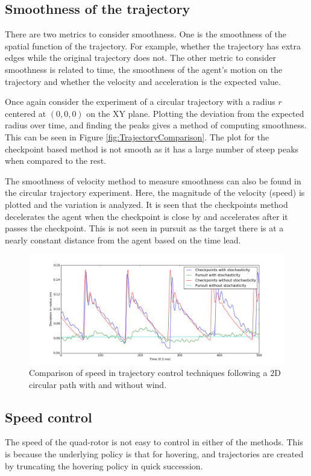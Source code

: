 \documentclass[hidelinks,BTech]{iitmdiss}
\begin{document}
\subsection{Smoothness of the trajectory}
There are two metrics to consider smoothness. One is the smoothness of the spatial function of the trajectory. For example, whether the trajectory has extra edges while the original trajectory does not. The other metric to consider smoothness is related to time, the smoothness of the agent's motion on the trajectory and whether the velocity and acceleration is the expected value.

Once again consider the experiment of a circular trajectory with a radius $r$ centered at $(0,0,0)$ on the XY plane. Plotting the deviation from the expected radius over time, and finding the peaks gives a method of computing smoothness. This can be seen in Figure \ref{fig:TrajectoryComparison}. The plot for the checkpoint based method is not smooth as it has a large number of steep peaks when compared to the rest.

The smoothness of velocity method to measure smoothness can also be found in the circular trajectory experiment. Here, the magnitude of the velocity (speed) is plotted and the variation is analyzed. It is seen that the checkpoints method decelerates the agent when the checkpoint is close by and accelerates after it passes the checkpoint. This is not seen in pursuit as the target there is at a nearly constant distance from the agent based on the time lead.

\begin{figure}[H]
  \centering
    \includegraphics[width=\textwidth]{comparison_velocity.png}
    \caption{Comparison of speed in trajectory control techniques following a 2D circular path with and without wind.}
\end{figure}

\subsection{Speed control}
The speed of the quad-rotor is not easy to control in either of the methods. This is because the underlying policy is that for hovering, and trajectories are created by truncating the hovering policy in quick succession.
\end{document}
